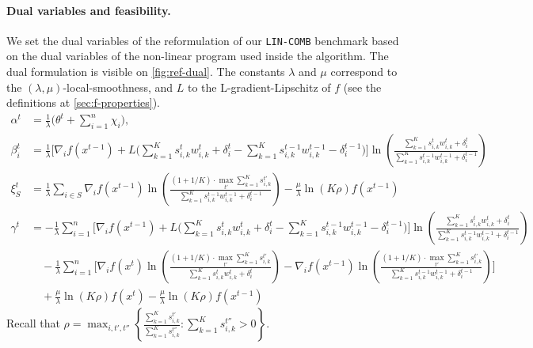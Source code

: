 \paragraph{Dual variables and feasibility.} We set the dual variables of the reformulation of our \texttt{LIN-COMB} benchmark based on the dual variables of the non-linear program used inside the algorithm. The dual formulation is visible on \cref{fig:ref-dual}. The constants $\lambda$ and $\mu$ correspond to the $(\lambda,\mu)$-local-smoothness, and $L$ to the L-gradient-Lipschitz of $f$ (see the definitions at \cref{sec:f-properties}).
%
\begin{align*}
    \alpha^{t} &= \frac{1}{\lambda}  \biggl( \theta^{t} + \sum_{i=1}^{n} \chi_{i} \biggr), \\
    \beta_{i}^{t} &= \frac{1}{\lambda} \biggl[  \nabla_{i} f(x^{t-1}) + L\biggl( \sum_{k=1}^{K} s_{i,k}^{t} w_{i,k}^{t} + \delta_{i}^{t} - \sum_{k=1}^{K} s_{i,k}^{t-1} w_{i,k}^{t-1} - \delta_{i}^{t-1} \biggr)  \biggr] \ln \left( \frac{\sum_{k=1}^{K} s_{i,k}^{t} w_{i,k}^{t} + \delta_{i}^{t}}{\sum_{k=1}^{K}  s_{i,k}^{t-1}w_{i,k}^{t-1}  + \delta_{i}^{t-1}} \right) \\
    \xi_{S}^{t} &= \frac{1}{\lambda} \sum_{i \in S} \nabla_{i} f(x^{t-1}) \ln \left( \frac{(1 + 1/K) \cdot \max_{t'} \sum_{k=1}^{K} s_{i,k}^{t'}}{\sum_{k=1}^{K}  s_{i,k}^{t-1}w_{i,k}^{t-1}  + \delta_{i}^{t-1}} \right) - \frac{\mu}{\lambda} \ln(K\rho)  f(x^{t-1})\\
    \gamma^{t} &= -  \frac{1}{\lambda} \sum_{i=1}^{n} \biggl[  \nabla_{i} f(x^{t-1}) + L\biggl( \sum_{k=1}^{K} s_{i,k}^{t} w_{i,k}^{t} + \delta_{i}^{t} - \sum_{k=1}^{K} s_{i,k}^{t-1} w_{i,k}^{t-1} - \delta_{i}^{t-1} \biggr) \biggr]  \ln \left( \frac{\sum_{k=1}^{K} s_{i,k}^{t} w_{i,k}^{t} + \delta_{i}^{t}}{\sum_{k=1}^{K}  s_{i,k}^{t-1}w_{i,k}^{t-1}  + \delta_{i}^{t-1}} \right) \\
        & \quad - \frac{1}{\lambda} \sum_{i=1}^{n} \biggl[ \nabla_{i} f(x^{t}) \ln \left( \frac{(1 + 1/K) \cdot \max_{t'} \sum_{k=1}^{K} s_{i,k}^{t'}}{\sum_{k=1}^{K}  s_{i,k}^{t}w_{i,k}^{t}  + \delta_{i}^{t}} \right) -  \nabla_{i} f(x^{t-1}) \ln \left( \frac{(1 + 1/K) \cdot \max_{t'} \sum_{k=1}^{K} s_{i,k}^{t'}}{\sum_{k=1}^{K}  s_{i,k}^{t-1}w_{i,k}^{t-1}  + \delta_{i}^{t-1}} \right) \biggr] \\
    & \quad + \frac{\mu}{\lambda} \ln(K\rho) f(x^{t}) - \frac{\mu}{\lambda} \ln(K\rho) f(x^{t-1})
\end{align*}
%
Recall that $\rho = \max_{i, t',t''} \left\{\frac{\sum_{k=1}^{K} s_{i,k}^{t'}}{\sum_{k=1}^{K} s_{i,k}^{t''}} : \sum_{k=1}^{K} s_{i,k}^{t''} > 0 \right\}$.

